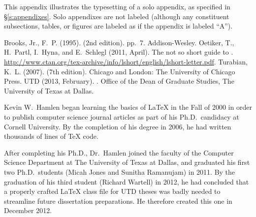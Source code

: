 \documentclass[doublespacing]{utdthesis}
\begin{document}
This appendix illustrates the typesetting of a solo appendix, as specified
in \S\ref{s:appendixes}.
Solo appendixes are not labeled (although any constituent subsections,
tables, or figures are labeled as if the appendix is labeled ``A'').

\begin{thesisbib}  %
%
%
% 
%

  \begin{thebibliography}{}
  {Brooks, Jr.}, F.~P. (1995).
   (2nd edition). pp.~7.
  \newblock Addison-Wesley.
  Oetiker, T., H.~Partl, I.~Hyna, and E.~Schlegl (2011, April).
  \newblock The not so short guide to {\LaTeXe}.
  \newblock
    \url{http://www.ctan.org/tex-archive/info/lshort/english/lshort-letter.pdf}.
  Turabian, K.~L. (2007).
   (7th edition).
  \newblock Chicago and London: The University of Chicago Press.
  {UTD} (2013, February).
  .
  \newblock Office of the Dean of Graduate Studies, The University of Texas at
    Dallas.
  \end{thebibliography}

\end{thesisbib}  %

\begin{vita}
Kevin W.~Hamlen began learning the basics of \LaTeX{} in the Fall of 2000 in
order to publish computer science journal articles as part of his
Ph.D.~candidacy at Cornell University.
By the completion of his degree in 2006, he had written thousands of lines of
\TeX{} code.

After completing his Ph.D., Dr.~Hamlen joined the faculty of the Computer
Science Department at The University of Texas at Dallas, and graduated his
first two Ph.D.~students (Micah Jones and Sunitha Ramanujam) in 2011.
By the graduation of his third student (Richard Wartell) in 2012, he had
concluded that a properly crafted \LaTeX{} class file for UTD theses was badly
needed to streamline future dissertation preparations.
He therefore created this one in December 2012.
\end{vita}
\end{document}
